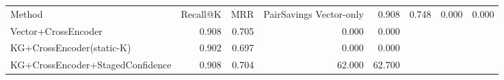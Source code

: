 \begin{tabular}{lrrrr}
\toprule
Method & Recall@K & MRR & PairSavings%
\midrule
Vector-only & 0.908 & 0.748 & 0.000 & 0.000 \\
Vector+CrossEncoder & 0.908 & 0.705 & 0.000 & 0.000 \\
KG+CrossEncoder(static-K) & 0.902 & 0.697 & 0.000 & 0.000 \\
KG+CrossEncoder+StagedConfidence & 0.908 & 0.704 & 62.000 & 62.700 \\
\bottomrule
\end{tabular}
